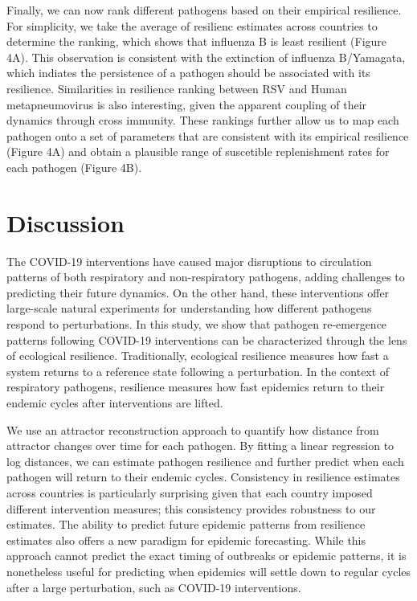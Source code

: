 \documentclass[12pt]{article}
\begin{document}
Finally, we can now rank different pathogens based on their empirical resilience.
For simplicity, we take the average of resilienc estimates across countries to determine the ranking, which shows that influenza B is least resilient (Figure 4A).
This observation is consistent with the extinction of influenza B/Yamagata, which indiates the persistence of a pathogen should be associated with its resilience.
Similarities in resilience ranking between RSV and Human metapneumovirus is also interesting, given the apparent coupling of their dynamics through cross immunity.
These rankings further allow us to map each pathogen onto a set of parameters that are consistent with its empirical resilience (Figure 4A) and obtain a plausible range of suscetible replenishment rates for each pathogen (Figure 4B).

\section*{Discussion}

The COVID-19 interventions have caused major disruptions to circulation patterns of both respiratory and non-respiratory pathogens, adding challenges to predicting their future dynamics.
On the other hand, these interventions offer large-scale natural experiments for understanding how different pathogens respond to perturbations.
In this study, we show that pathogen re-emergence patterns following COVID-19 interventions can be characterized through the lens of ecological resilience.
Traditionally, ecological resilience measures how fast a system returns to a reference state following a perturbation.
In the context of respiratory pathogens, resilience measures how fast epidemics return to their endemic cycles after interventions are lifted.

We use an attractor reconstruction approach to quantify how distance from attractor changes over time for each pathogen.
By fitting a linear regression to log distances, we can estimate pathogen resilience and further predict when each pathogen will return to their endemic cycles.
Consistency in resilience estimates across countries is particularly surprising given that each country imposed different intervention measures; this consistency provides robustness to our estimates.
The ability to predict future epidemic patterns from resilience estimates also offers a new paradigm for epidemic forecasting.
While this approach cannot predict the exact timing of outbreaks or epidemic patterns, it is nonetheless useful for predicting when epidemics will settle down to regular cycles after a large perturbation, such as COVID-19 interventions.
\end{document}
